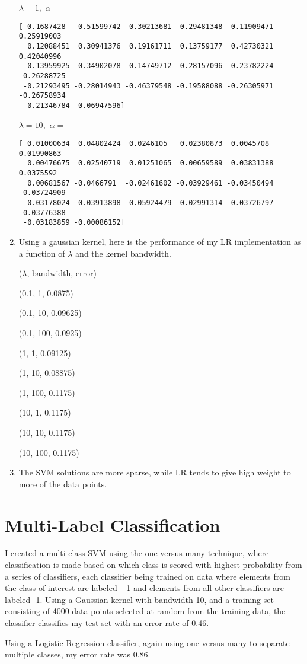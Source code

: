 \documentclass{paper}
\begin{document}
\begin{enumerate}
$\lambda = 1,$
$\alpha = $
\begin{verbatim}
[ 0.1687428   0.51599742  0.30213681  0.29481348  0.11909471  0.25919003
  0.12088451  0.30941376  0.19161711  0.13759177  0.42730321  0.42040996
  0.13959925 -0.34902078 -0.14749712 -0.28157096 -0.23782224 -0.26288725
 -0.21293495 -0.28014943 -0.46379548 -0.19588088 -0.26305971 -0.26758934
 -0.21346784  0.06947596]
\end{verbatim}


$\lambda = 10,$
$\alpha = $
\begin{verbatim}
[ 0.01000634  0.04802424  0.0246105   0.02380873  0.0045708   0.01990863
  0.00476675  0.02540719  0.01251065  0.00659589  0.03831388  0.0375592
  0.00681567 -0.0466791  -0.02461602 -0.03929461 -0.03450494 -0.03724909
 -0.03178024 -0.03913898 -0.05924479 -0.02991314 -0.03726797 -0.03776388
 -0.03183859 -0.00086152]
\end{verbatim}

    \item
        Using a gaussian kernel, here is the performance of my LR implementation as a function of $\lambda$ and the kernel bandwidth.

($\lambda$, bandwidth, error)

(0.1, 1, 0.0875)

(0.1, 10, 0.09625)

(0.1, 100, 0.0925)



(1, 1, 0.09125)

(1, 10, 0.08875)

(1, 100, 0.1175)



(10, 1, 0.1175)

(10, 10, 0.1175)

(10, 100, 0.1175)


    \item
        The SVM solutions are more sparse, while LR tends to give high weight to more of the data points.

\end{enumerate}

\section{Multi-Label Classification}

I created a multi-class SVM using the one-versus-many technique, where classification is made based on which class is scored with highest probability from a series of classifiers, each classifier being trained on data where elements from the class of interest are labeled +1 and elements from all other classifiers are labeled -1. Using a Gaussian kernel with bandwidth 10, and a training set consisting of 4000 data points selected at random from the training data, the classifier classifies my test set with an error rate of 0.46. 

Using a Logistic Regression classifier, again using one-versus-many to separate multiple classes, my error rate was 0.86.
\end{document}
